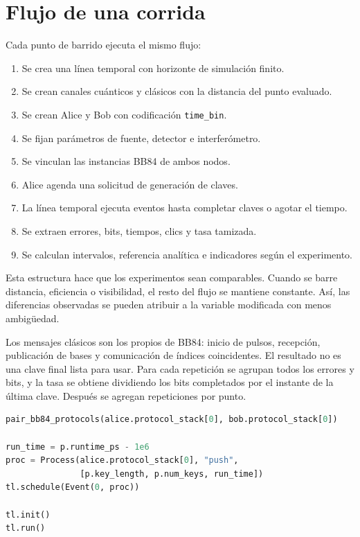 \section{Flujo de una corrida}

Cada punto de barrido ejecuta el mismo flujo:

\begin{enumerate}
  \item Se crea una línea temporal con horizonte de simulación finito.
  \item Se crean canales cuánticos y clásicos con la distancia del punto evaluado.
  \item Se crean Alice y Bob con codificación \texttt{time\_bin}.
  \item Se fijan parámetros de fuente, detector e interferómetro.
  \item Se vinculan las instancias BB84 de ambos nodos.
  \item Alice agenda una solicitud de generación de claves.
  \item La línea temporal ejecuta eventos hasta completar claves o agotar el tiempo.
  \item Se extraen errores, bits, tiempos, clics y tasa tamizada.
  \item Se calculan intervalos, referencia analítica e indicadores según el experimento.
\end{enumerate}

Esta estructura hace que los experimentos sean comparables. Cuando se barre distancia, eficiencia o visibilidad, el resto del flujo se mantiene constante. Así, las diferencias observadas se pueden atribuir a la variable modificada con menos ambigüedad.

Los mensajes clásicos son los propios de BB84: inicio de pulsos, recepción, publicación de bases y comunicación de índices coincidentes. El resultado no es una clave final lista para usar. Para cada repetición se agrupan todos los errores y bits, y la tasa se obtiene dividiendo los bits completados por el instante de la última clave. Después se agregan \PThreeRepetitions{} repeticiones por punto.

\begin{lstlisting}[language=Python, caption={Agenda del proceso BB84 en la línea temporal.}, label={lst:agenda_bb84_cap6}]
pair_bb84_protocols(alice.protocol_stack[0], bob.protocol_stack[0])

run_time = p.runtime_ps - 1e6
proc = Process(alice.protocol_stack[0], "push",
               [p.key_length, p.num_keys, run_time])
tl.schedule(Event(0, proc))

tl.init()
tl.run()
\end{lstlisting}

